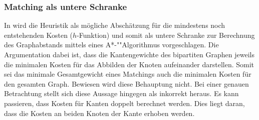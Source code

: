 \subsubsection{Matching als untere Schranke}
In \cite{RiesenSpeedingup} wird die Heuristik als mögliche Abschätzung für die 
mindestens noch entstehenden Kosten ($h$-Funktion) und somit als untere 
Schranke zur Berechnung des Graphabstands mittels eines A*-""Algorithmus vorgeschlagen. 
Die Argumentation dabei ist, dass 
die Kantengewichte des bipartiten Graphen jeweils die minimalen Kosten 
für das Abbilden der Knoten aufeinander darstellen. Somit sei das minimale 
Gesamtgewicht eines Matchings auch die minimalen Kosten für den gesamten 
Graph. Bewiesen wird diese Behauptung nicht. 
Bei einer genauen Betrachtung stellt sich diese Aussage hingegen als inkorrekt heraus. 
 Es kann passieren, dass Kosten für Kanten doppelt 
berechnet werden. Dies liegt daran, dass die Kosten an beiden Knoten der Kante 
erhoben werden.


